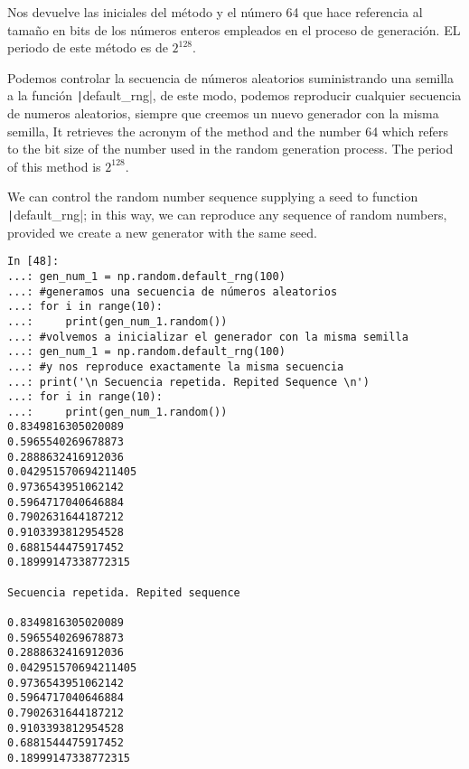 \begin{paracol}{2}
Nos devuelve las iniciales del método y el número 64 que hace referencia al tamaño en bits de los números enteros empleados en el proceso de generación. EL periodo de este método es de $2^{128}$.

Podemos controlar la secuencia de números aleatorios suministrando una semilla a la función \texttt|default_rng|, de este modo, podemos reproducir cualquier secuencia de numeros aleatorios, siempre que creemos un nuevo generador con la misma semilla,
\switchcolumn
It retrieves the acronym of the method and the number 64 which refers to the bit size of the number used in the random generation process. The period of this method is $2^{128}$.

We can control the random number sequence supplying a seed to function \texttt|default_rng|; in this way, we can reproduce any sequence of random numbers, provided we create a new generator with the same seed. 
\end{paracol}
\begin{verbatim}
In [48]: 
...: gen_num_1 = np.random.default_rng(100)
...: #generamos una secuencia de números aleatorios
...: for i in range(10):
...:     print(gen_num_1.random())
...: #volvemos a inicializar el generador con la misma semilla
...: gen_num_1 = np.random.default_rng(100)
...: #y nos reproduce exactamente la misma secuencia
...: print('\n Secuencia repetida. Repited Sequence \n')
...: for i in range(10):
...:     print(gen_num_1.random())
0.8349816305020089
0.5965540269678873
0.2888632416912036
0.042951570694211405
0.9736543951062142
0.5964717040646884
0.7902631644187212
0.9103393812954528
0.6881544475917452
0.18999147338772315

Secuencia repetida. Repited sequence

0.8349816305020089
0.5965540269678873
0.2888632416912036
0.042951570694211405
0.9736543951062142
0.5964717040646884
0.7902631644187212
0.9103393812954528
0.6881544475917452
0.18999147338772315
\end{verbatim}

